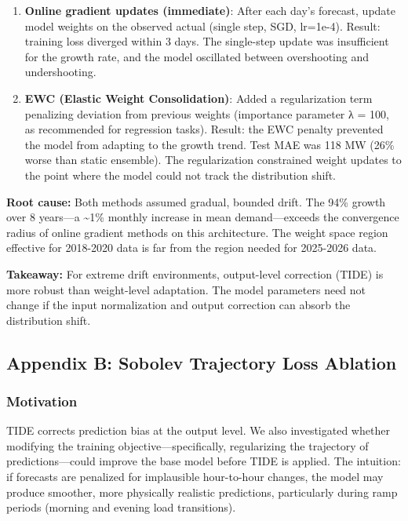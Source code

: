 \begin{enumerate}
\def\labelenumi{\arabic{enumi}.}
\item
  \textbf{Online gradient updates (immediate)}: After each day's
  forecast, update model weights on the observed actual (single step,
  SGD, lr=1e-4). Result: training loss diverged within 3 days. The
  single-step update was insufficient for the growth rate, and the model
  oscillated between overshooting and undershooting.
\item
  \textbf{EWC (Elastic Weight Consolidation)}: Added a regularization
  term penalizing deviation from previous weights (importance parameter
  λ = 100, as recommended for regression tasks). Result: the EWC penalty
  prevented the model from adapting to the growth trend. Test MAE was
  118 MW (26\% worse than static ensemble). The regularization
  constrained weight updates to the point where the model could not
  track the distribution shift.
\end{enumerate}

\textbf{Root cause:} Both methods assumed gradual, bounded drift. The
94\% growth over 8 years---a \textasciitilde1\% monthly increase in mean
demand---exceeds the convergence radius of online gradient methods on
this architecture. The weight space region effective for 2018-2020 data
is far from the region needed for 2025-2026 data.

\textbf{Takeaway:} For extreme drift environments, output-level
correction (TIDE) is more robust than weight-level adaptation. The model
parameters need not change if the input normalization and output
correction can absorb the distribution shift.

\subsection{Appendix B: Sobolev Trajectory Loss
Ablation}\label{appendix-b-sobolev-trajectory-loss-ablation}

\subsubsection{Motivation}\label{motivation}

TIDE corrects prediction bias at the output level. We also investigated
whether modifying the training objective---specifically, regularizing
the trajectory of predictions---could improve the base model before TIDE
is applied. The intuition: if forecasts are penalized for implausible
hour-to-hour changes, the model may produce smoother, more physically
realistic predictions, particularly during ramp periods (morning and
evening load transitions).

